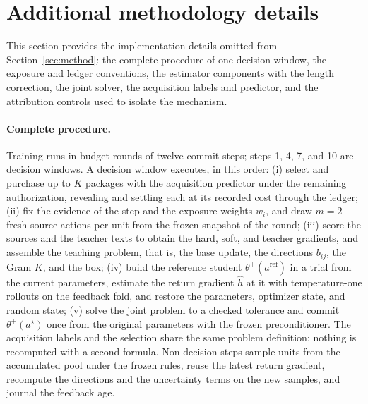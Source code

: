 
\section{Additional methodology details}\label{app:method}

This section provides the implementation details omitted from
Section~\ref{sec:method}: the complete procedure of one decision
window, the exposure and ledger conventions, the estimator components
with the length correction, the joint solver, the acquisition labels
and predictor, and the attribution controls used to isolate the
mechanism.

\paragraph{Complete procedure.}
Training runs in budget rounds of twelve commit steps; steps 1, 4, 7,
and 10 are decision windows. A decision window executes, in this
order: (i) select and purchase up to $K$ packages with the acquisition
predictor under the remaining authorization, revealing and settling
each at its recorded cost through the ledger; (ii) fix the evidence
of the step and the exposure weights $w_i$, and draw $m=2$ fresh
source actions per unit from the frozen snapshot of the round;
(iii) score the sources and the teacher texts to obtain the hard,
soft, and teacher gradients, and assemble the teaching problem, that
is, the base update, the directions $b_{ij}$, the Gram $K$, and the
box; (iv) build the reference student $\theta^{+}(a^{\mathrm{ref}})$
in a trial from the current parameters, estimate the return gradient
$\hat h$ at it with temperature-one rollouts on the feedback fold, and
restore the parameters, optimizer state, and random state; (v) solve
the joint problem to a checked tolerance and commit
$\theta^{+}(a^{\star})$ once from the original parameters with the
frozen preconditioner. The acquisition labels and the selection share
the same problem definition; nothing is recomputed with a second
formula. Non-decision steps sample units from the accumulated pool
under the frozen rules, reuse the latest return gradient, recompute
the directions and the uncertainty terms on the new samples, and
journal the feedback age.

